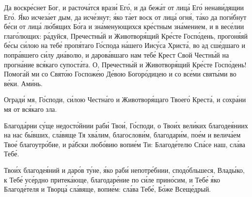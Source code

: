 \begin{mymulticols}



Да воскр\'{е}снет Бог, и расточ\'{а}тся враз\'{и} Ег\'{о}, и да беж\'{а}т от лиц\'{а} Ег\'{о} ненав\'{и}дящии Ег\'{о}. \'{Я}ко исчез\'{а}ет дым, да исч\'{е}знут; \'{я}ко т\'{а}ет воск от лиц\'{а} огн\'{я}, т\'{а}ко да пог\'{и}бнут б\'{е}си от лиц\'{а} л\'{ю}бящих Б\'{о}га и зн\'{а}менующихся кр\'{е}стным зн\'{а}мением, и в вес\'{е}лии глаг\'{о}лющих: р\'{а}дуйся, Пречестн\'{ы}й и Животвор\'{я}щий Кр\'{е}сте Госп\'{о}день, прогон\'{я}яй б\'{е}сы с\'{и}лою на теб\'{е} проп\'{я}таго Г\'{о}спода н\'{а}шего Иис\'{у}са Христ\'{а}, во ад сш\'{е}дшаго и попр\'{а}вшего с\'{и}лу ди\'{а}волю, и даров\'{а}вшаго нам теб\'{е} Крест Свой Честн\'{ы}й на прогн\'{а}ние вс\'{я}каго супост\'{а}та. О, Пречестн\'{ы}й и Животвор\'{я}щий Кр\'{е}сте Госп\'{о}день! Помог\'{а}й ми со Свят\'{о}ю Госпож\'{е}ю Д\'{е}вою Богор\'{о}дицею и со вс\'{е}ми свят\'{ы}ми во в\'{е}ки. Ам\'{и}нь.


Оград\'{и} мя, Г\'{о}споди, с\'{и}лою Честн\'{а}го и Животвор\'{я}щаго Твоег\'{о} Крест\'{а}, и сохр\'{а}ни мя от вс\'{я}каго зла.

\end{mymulticols}

\mychapterending

\begin{mymulticols}



Благод\'{а}рни с\'{у}ще недост\'{о}йнии раб\'{и} Тво\'{и}, Г\'{о}споди, о Тво\'{и}х вел\'{и}ких благоде\'{я}ниих на нас б\'{ы}вших, сл\'{а}вяще Тя хв\'{а}лим, благослов\'{и}м, благодар\'{и}м, по\'{е}м и велич\'{а}ем Тво\'{е} благоутр\'{о}бие, и р\'{а}бски люб\'{о}вию вопи\'{е}м Ти: Благод\'{е}телю Сп\'{а}се наш, сл\'{а}ва Теб\'{е}.


Тво\'{и}х благоде\'{я}ний и дар\'{о}в т\'{у}не, \'{я}ко раб\'{и} непотр\'{е}бнии, спод\'{о}бльшеся, Влад\'{ы}ко, к Теб\'{е} ус\'{е}рдно притек\'{а}юще, благодар\'{е}ние по с\'{и}ле прин\'{о}сим, и Теб\'{е} \'{я}ко Благод\'{е}теля и Творц\'{а} сл\'{а}вяще, вопи\'{е}м: сл\'{а}ва Теб\'{е}, Б\'{о}же Всещ\'{е}дрый.

\slavainynen


\end{mymulticols}

